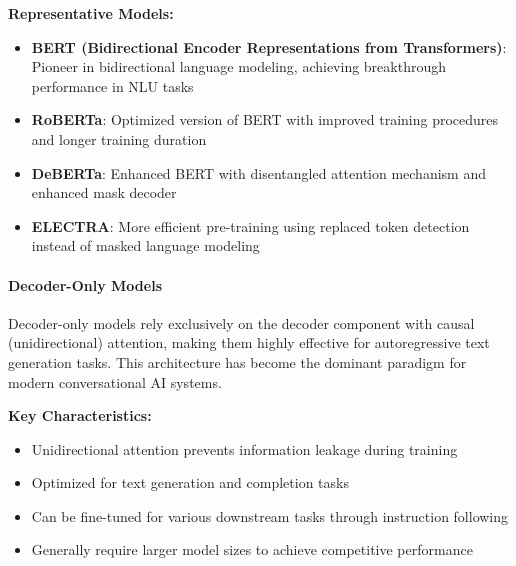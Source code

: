 \documentclass[12pt,a4paper]{article}
\begin{document}
\textbf{Representative Models:}
\begin{itemize}
    \item \textbf{BERT (Bidirectional Encoder Representations from Transformers)}: Pioneer in bidirectional language modeling, achieving breakthrough performance in NLU tasks
    \item \textbf{RoBERTa}: Optimized version of BERT with improved training procedures and longer training duration
    \item \textbf{DeBERTa}: Enhanced BERT with disentangled attention mechanism and enhanced mask decoder
    \item \textbf{ELECTRA}: More efficient pre-training using replaced token detection instead of masked language modeling
\end{itemize}

\paragraph{Decoder-Only Models}


Decoder-only models rely exclusively on the decoder component with causal (unidirectional) attention, making them highly effective for autoregressive text generation tasks. This architecture has become the dominant paradigm for modern conversational AI systems.

\textbf{Key Characteristics:}
\begin{itemize}
    \item Unidirectional attention prevents information leakage during training
    \item Optimized for text generation and completion tasks
    \item Can be fine-tuned for various downstream tasks through instruction following
    \item Generally require larger model sizes to achieve competitive performance
\end{itemize}
\end{document}
